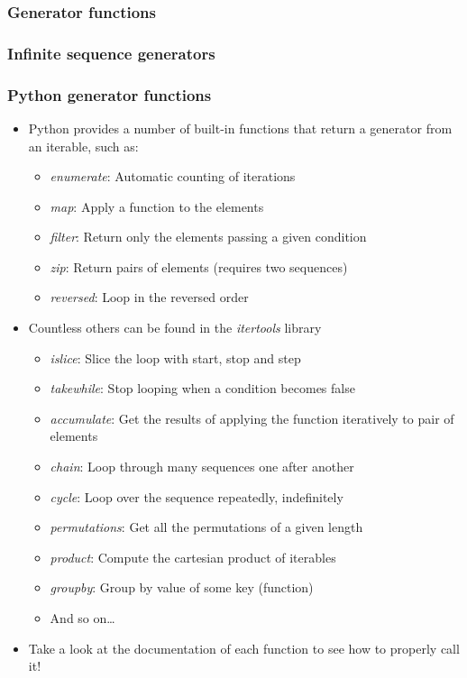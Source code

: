 \documentclass[9pt]{beamer}
\begin{document}
\begin{frame}
  \frametitle{Generator functions}
  
\end{frame}


\begin{frame}
  \frametitle{Infinite sequence generators}
  
\end{frame}


\begin{frame}
  \frametitle{Python generator functions}
  
  \begin{itemize}
    \item Python provides a number of built-in functions that return a generator from an iterable, such as:
    \begin{itemize}
      \item \emph{enumerate}: Automatic counting of iterations
      \item \emph{map}: Apply a function to the elements
      \item \emph{filter}: Return only the elements passing a given condition
      \item \emph{zip}: Return pairs of elements (requires two sequences)
      \item \emph{reversed}: Loop in the reversed order
    \end{itemize}

    \item Countless others can be found in the \alert{\emph{itertools}} library
    \begin{itemize}
      \item \emph{islice}: Slice the loop with start, stop and step
      \item \emph{takewhile}: Stop looping when a condition becomes false
      \item \emph{accumulate}: Get the results of applying the function iteratively to pair of elements
      \item \emph{chain}: Loop through many sequences one after another
      \item \emph{cycle}: Loop over the sequence repeatedly, indefinitely
      \item \emph{permutations}: Get all the permutations of a given length
      \item \emph{product}: Compute the cartesian product of iterables
      \item \emph{groupby}: Group by value of some key (function)     
      \item And so on\dots
    \end{itemize}
    
    \medskip
    
    \item Take a look at the documentation of each function to see how to 
          properly call it!
  \end{itemize}  
\end{frame}
\end{document}

